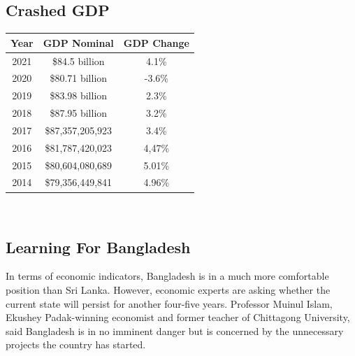 \documentclass[a4paper,12pt]{article}
\begin{document}
\subsection{Crashed GDP}
\begin{center}
\begin{tabular}{|c c  c|}

 \hline
 Year & GDP Nominal & GDP Change \\ [0.5ex] 
 \hline\hline
 2021 & \$84.5 billion & 4.1\% \\ 
 \hline
 2020 & \$80.71 billion & -3.6\% \\ 
 \hline
 2019 & \$83.98 billion & 2.3\% \\ 
 \hline
 2018 & \$87.95 billion  & 3.2\% \\ 
 \hline
 2017 & \$87,357,205,923 & 3.4\% \\
 \hline
 2016 & \$81,787,420,023 & 4,47\% \\
 \hline
 2015 & \$80,604,080,689 & 5.01\% \\
 \hline
 2014 & \$79,356,449,841 & 4.96\% \\ [1ex] 
 \hline
\end{tabular}
\end{center}
\\
\newpage
\justifying
\subsection{Learning For Bangladesh}
In terms of economic indicators, Bangladesh is in a much more comfortable position than Sri Lanka. However, economic experts are asking whether the current state will persist for another four-five years.
Professor Muinul Islam, Ekushey Padak-winning economist and former teacher of Chittagong University, said Bangladesh is in no imminent danger but is concerned by the unnecessary projects the country has started.
\end{document}
